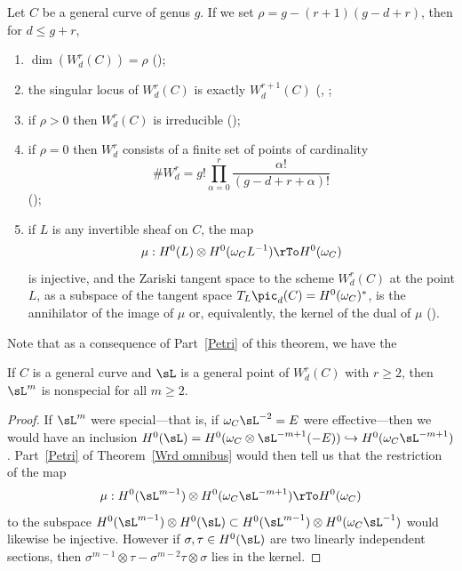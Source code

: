 \begin{theorem}\label{Wrd omnibus}
Let $C$ be a general curve of genus $g$. If we set $\rho = g - (r+1)(g-d+r)$, then for $d \leq g+r$,
\begin{enumerate}

\item $\dim(W^r_d(C)) = \rho$ (\cite{Griffiths-Harris-BN});

\item\label{sing wrd} the singular locus of $W^r_d(C)$ is exactly $W^{r+1}_d(C)$
(\cite{Gieseker-Petri}, \cite{Lazarsfeld-Petri};
\label{irr wrd} 

\item if $\rho > 0$ then $W^r_d(C)$ is irreducible (\cite{MR611386});

\item\label{rho=0} if $\rho = 0$ then $W^r_d$ consists of a finite set of  points of cardinality
$$
\#W^r_d = g! \prod_{\alpha=0}^r \frac{\alpha!}{(g-d+r+\alpha)!}
$$
(\cite{MR323792});

\item\label{Petri} if $L$ is any invertible sheaf on $C$, the map
$$
\mu : H^0(L) \otimes H^0(\omega_CL^{-1}) \rTo H^0(\omega_C)
$$
is injective, and the Zariski tangent space to the scheme $W^r_d(C)$ at the point $L$, as a subspace
of the tangent space $T_L\pic_d(C) = H^0(\omega_C)^*$, is the annihilator of the image of $\mu$
or, equivalently, the kernel of the dual of $\mu$ (\cite{Gieseker-Petri}).
\end{enumerate}
\end{theorem}

Note that as a consequence of Part~\ref{Petri} of this theorem, we have the

\begin{corollary}\label{2L nonspecial}
If $C$ is a general curve and $\sL$ is a general point of $W^r_d(C)$ with $r\geq 2$,
 then $\sL^m$ is nonspecial for all $m \geq 2$.
\end{corollary}

\begin{proof}
If $\sL^m$ were special---that is, if $\omega_C\sL^{-2} = E$ were effective---then we would have an inclusion $H^0(\sL) = H^0(\omega_C\otimes \sL^{-m+1}(-E)) \hookrightarrow H^0(\omega_C\sL^{-m+1})$. Part~\ref{Petri} of Theorem~\ref{Wrd omnibus} would then tell us that the restriction of the map 
 $$
\mu : H^0(\sL^{m-1}) \otimes H^0(\omega_C\sL^{-m+1}) \rTo H^0(\omega_C)
$$
to the subspace $H^0(\sL^{m-1}) \otimes H^0(\sL) \subset H^0(\sL^{m-1}) \otimes H^0(\omega_C\sL^{-1})$ would likewise be injective.
However if $\sigma, \tau \in H^0(\sL)$ are two linearly independent sections, then $\sigma^{m-1} \otimes \tau - \sigma^{m-2}\tau \otimes \sigma$ lies in the kernel.
\end{proof}

